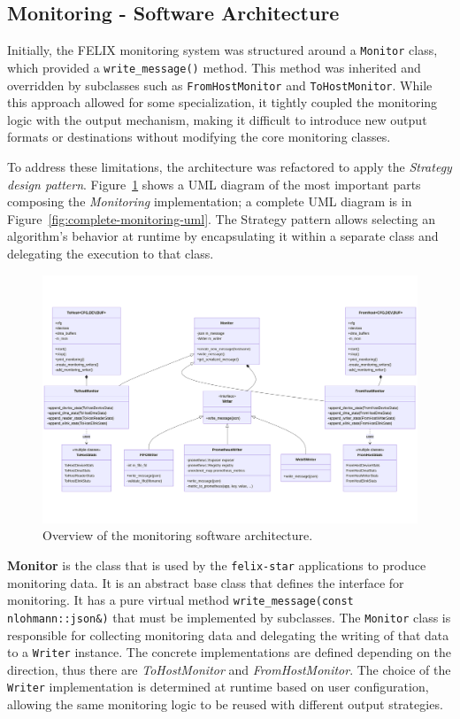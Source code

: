 \clearpage
\subsection{Monitoring - Software Architecture}

Initially, the \acs{FELIX} monitoring system was structured around a \texttt{Monitor} class, which provided a \texttt{write\_message()} method. This method was inherited and overridden by subclasses such as \texttt{FromHostMonitor} and \texttt{ToHostMonitor}. While this approach allowed for some specialization, it tightly coupled the monitoring logic with the output mechanism, making it difficult to introduce new output formats or destinations without modifying the core monitoring classes.

To address these limitations, the architecture was refactored to apply the \textit{Strategy design pattern}. Figure~\ref{fig:monitoring-software-architecture} shows a UML diagram of the most important parts composing the \textit{Monitoring} implementation; a complete UML diagram is in Figure~\ref{fig:complete-monitoring-uml}. The Strategy pattern allows selecting an algorithm's behavior at runtime by encapsulating it within a separate class and delegating the execution to that class.

\begin{figure}[htbp]
\centering
\includegraphics[width=\textwidth]{images/contributions/monitoring-uml.png}
\caption{Overview of the monitoring software architecture.}
\label{fig:monitoring-software-architecture}
\end{figure}

\textbf{Monitor} is the class that is used by the \texttt{felix-star} applications to produce monitoring data. It is an abstract base class that defines the interface for monitoring. It has a pure virtual method \texttt{write\_message(const nlohmann::json\&)} that must be implemented by subclasses. The \texttt{Monitor} class is responsible for collecting monitoring data and delegating the writing of that data to a \texttt{Writer} instance. The concrete implementations are defined depending on the direction, thus there are \emph{ToHostMonitor} and \emph{FromHostMonitor}. The choice of the \texttt{Writer} implementation is determined at runtime based on user configuration, allowing the same monitoring logic to be reused with different output strategies.

